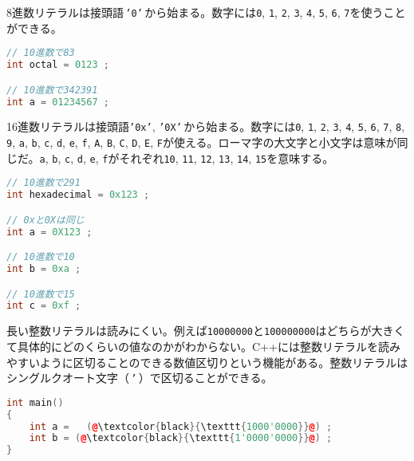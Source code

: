 
8進数リテラルは接頭語\,\texttt{'0'}\,から始まる。数字には\texttt{0}, \texttt{1}, \texttt{2}, \texttt{3}, \texttt{4}, \texttt{5}, \texttt{6}, \texttt{7}を使うことができる。

\begin{lstlisting}[language={C++}]
// 10進数で83
int octal = 0123 ;

// 10進数で342391
int a = 01234567 ;
\end{lstlisting}


16進数リテラルは接頭語\texttt{'0x'}, \texttt{'0X'}\,から始まる。数字には\texttt{0}, \texttt{1}, \texttt{2}, \texttt{3}, \texttt{4}, \texttt{5}, \texttt{6}, \texttt{7}, \texttt{8}, \texttt{9}, \texttt{a}, \texttt{b}, \texttt{c}, \texttt{d}, \texttt{e}, \texttt{f}, \texttt{A}, \texttt{B}, \texttt{C}, \texttt{D}, \texttt{E}, \texttt{F}が使える。ローマ字の大文字と小文字は意味が同じだ。\texttt{a}, \texttt{b}, \texttt{c}, \texttt{d}, \texttt{e}, \texttt{f}がそれぞれ\texttt{10}, \texttt{11}, \texttt{12}, \texttt{13}, \texttt{14}, \texttt{15}を意味する。

\begin{lstlisting}[language={C++}]
// 10進数で291
int hexadecimal = 0x123 ;

// 0xと0Xは同じ
int a = 0X123 ;

// 10進数で10
int b = 0xa ;

// 10進数で15
int c = 0xf ;
\end{lstlisting}


長い整数リテラルは読みにくい。例えば\texttt{10000000}と\texttt{100000000}はどちらが大きくて具体的にどのくらいの値なのかがわからない。C++には整数リテラルを読みやすいように区切ることのできる数値区切りという機能がある。整数リテラルはシングルクオート文字（\,\texttt{'}\,）で区切ることができる。

\begin{lstlisting}[language={C++}]
int main()
{
    int a =   (@\textcolor{black}{\texttt{1000'0000}}@) ;
    int b = (@\textcolor{black}{\texttt{1'0000'0000}}@) ;
}
\end{lstlisting}

